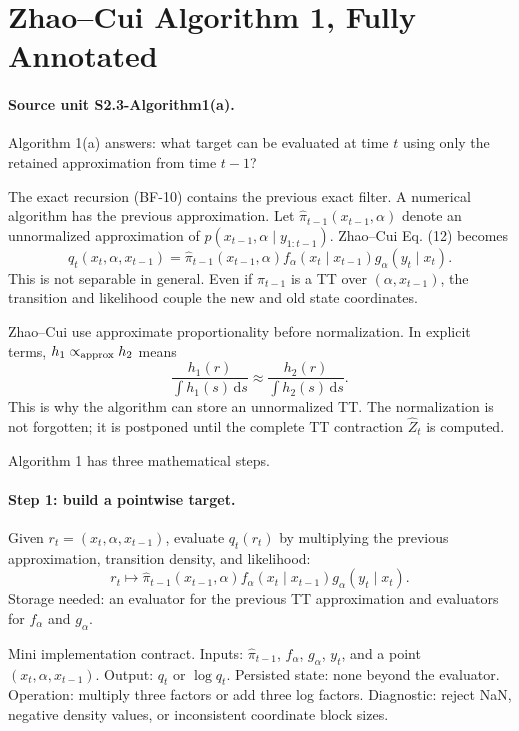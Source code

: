 \documentclass[11pt]{article}
\newcommand{\dd}{\,\mathrm d}
\begin{document}
\section{Zhao--Cui Algorithm 1, Fully Annotated}

\paragraph{Source unit S2.3-Algorithm1(a).}
Algorithm 1(a) answers: what target can be evaluated at time \(t\) using only
the retained approximation from time \(t-1\)?

The exact recursion (BF-10) contains the previous exact filter.  A numerical
algorithm has the previous approximation.  Let
\(\widehat\pi_{t-1}(x_{t-1},\alpha)\) denote an unnormalized approximation of
\(p(x_{t-1},\alpha\mid y_{1:t-1})\).  Zhao--Cui Eq. (12) becomes
\[
    q_t(x_t,\alpha,x_{t-1})
    =
    \widehat\pi_{t-1}(x_{t-1},\alpha)
    f_\alpha(x_t\mid x_{t-1})
    g_\alpha(y_t\mid x_t).
    \tag{A1-1}
\]
This is not separable in general.  Even if
\(\widehat\pi_{t-1}\) is a TT over \((\alpha,x_{t-1})\), the transition and
likelihood couple the new and old state coordinates.

Zhao--Cui use approximate proportionality before normalization.  In explicit
terms, \(h_1\propto_{\rm approx} h_2\) means
\[
    \frac{h_1(r)}{\int h_1(s)\dd s}
    \approx
    \frac{h_2(r)}{\int h_2(s)\dd s}.
    \tag{A1-0}
\]
This is why the algorithm can store an unnormalized TT.  The normalization is
not forgotten; it is postponed until the complete TT contraction
\(\widehat Z_t\) is computed.

Algorithm 1 has three mathematical steps.

\paragraph{Step 1: build a pointwise target.}
Given \(r_t=(x_t,\alpha,x_{t-1})\), evaluate \(q_t(r_t)\) by multiplying the
previous approximation, transition density, and likelihood:
\[
    r_t\mapsto
    \widehat\pi_{t-1}(x_{t-1},\alpha)
    f_\alpha(x_t\mid x_{t-1})
    g_\alpha(y_t\mid x_t).
\]
Storage needed: an evaluator for the previous TT approximation and evaluators
for \(f_\alpha\) and \(g_\alpha\).

Mini implementation contract.  Inputs:
\(\widehat\pi_{t-1}\), \(f_\alpha\), \(g_\alpha\), \(y_t\), and a point
\((x_t,\alpha,x_{t-1})\).  Output: \(q_t\) or \(\log q_t\).  Persisted state:
none beyond the evaluator.  Operation: multiply three factors or add three log
factors.  Diagnostic: reject NaN, negative density values, or inconsistent
coordinate block sizes.
\end{document}
